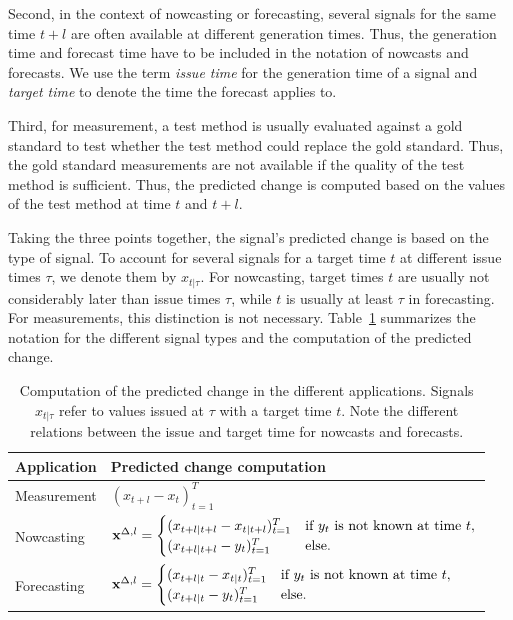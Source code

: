 Second, in the context of nowcasting or forecasting, several signals for the same time $t + l$ are often available at different generation times.
Thus, the generation time and forecast time have to be included in the notation of nowcasts and forecasts.
We use the term \textit{issue time} for the generation time of a signal and \textit{target time} to denote the time the forecast applies to.

Third, for measurement, a test method is usually evaluated against a gold standard to test whether the test method could replace the gold standard.
Thus, the gold standard measurements are not available if the quality of the test method is sufficient. 
Thus, the predicted change is computed based on the values of the test method at time $t$ and $t + l$.

Taking the three points together, the signal's predicted change is based on the type of signal.
To account for several signals for a target time $t$ at different issue times $\tau$, we denote them by $x_{t | \tau}$.
For nowcasting, target times $t$ are usually not considerably later than issue times $\tau$, while $t$ is usually at least $\tau$ in forecasting. For measurements, this distinction is not necessary.
Table~\ref{tab:notation} summarizes the notation for the different signal types and the computation of the predicted change.

\begin{table}
    \centering
    \begin{tabularx}{0.75\textwidth}{l X}
        \toprule
        Application & Predicted change computation \\
        \midrule
        Measurement & $(x_{t + l} - x_t)_{t=1}^T \label{eq:diffxl_measure} $\\
        Nowcasting & $
\mathbf{x}^{\Delta,l} =
\begin{cases}
(x_{t+l|t+l} -x_{t|t+l})^T_{t=1} & \text{if } y_{t} \text{ is not known at time } t, \\
(x_{t+l|t+l} -y_{t})^T_{t=1} & \text{else}.
\end{cases} \label{eq:diffxl_nowcasting}
$ \\
        Forecasting & $
\mathbf{x}^{\Delta,l} =
\begin{cases}
(x_{t+l|t} - x_{t|t})^T_{t=1} & \text{if } y_{t} \text{ is not known at time } t, \\
(x_{t+l|t} - y_{t})^T_{t=1}  & \text{else}.
\end{cases} \label{eq:diffxl_forecasting}
$\\
        \bottomrule
    \end{tabularx}
    \caption{Computation of the predicted change in the different applications. Signals $x_{t | \tau}$ refer to values issued at $\tau$ with a target time $t$. Note the different relations between the issue and target time for nowcasts and forecasts. }
    \label{tab:notation}
\end{table}



